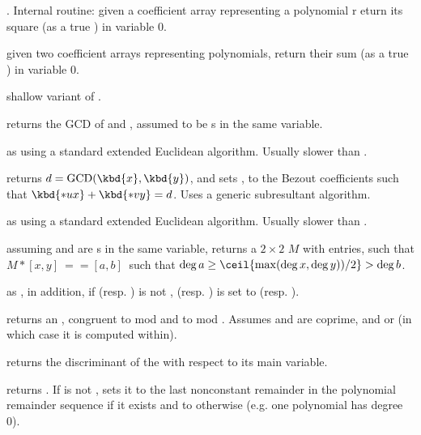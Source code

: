 . Internal routine:
given a coefficient array representing a polynomial r eturn its square (as a
true ) in variable $0$.

given two coefficient arrays representing polynomials, return their sum (as a
true ) in variable $0$.

 shallow
variant of .


 returns the GCD of  and ,
assumed to be s in the same variable.

 as  using a standard
extended Euclidean algorithm. Usually slower than .

 returns
$d = \text{GCD}(\kbd{x},\kbd{y})$, and sets ,  to the Bezout
coefficients such that $\kbd{*ux} + \kbd{*vy} = d$. Uses a generic
subresultant algorithm.

 as
 using a standard extended Euclidean algorithm. Usually
slower than .

assuming  and  are s in the same variable,
returns a $2\times 2$  $M$ with  entries,
such that $M*[x,y]~==[a,b]~$ such that
$\deg a \geq \ceil{\max(\deg x,\deg y))/2} > \deg b$.

as , in addition, if  (resp. ) is not
,  (resp. )
is set to  (resp. ).

returns an , congruent to  mod  and to  mod
. Assumes  and  are coprime, and 
or  (in which case it is computed within).

 returns the discriminant of the  
with respect to its main variable.

 returns
. If  is not , sets it to the last
nonconstant remainder in the polynomial remainder sequence if it exists and to
 otherwise (e.g. one polynomial has degree 0).

